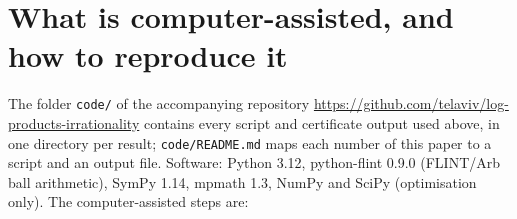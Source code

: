 \documentclass[11pt]{amsart}
\theoremstyle{definition}
\theoremstyle{remark}
\numberwithin{equation}{section}
\newcommand{\file}[1]{{\def\_{\textunderscore\allowbreak}\texttt{#1}}}
\begin{document}
\section{What is computer-assisted, and how to reproduce it}\label{sec:computer}

The folder \file{code/} of the accompanying repository \url{https://github.com/telaviv/log-products-irrationality}
contains every script and certificate output used above, in one directory per
result; \file{code/README.md} maps each number of this paper to a script and an output file. Software: Python 3.12,
python-flint 0.9.0 (FLINT/Arb ball arithmetic), SymPy 1.14, mpmath 1.3, NumPy and SciPy (optimisation only). The
computer-assisted steps are:
\end{document}
